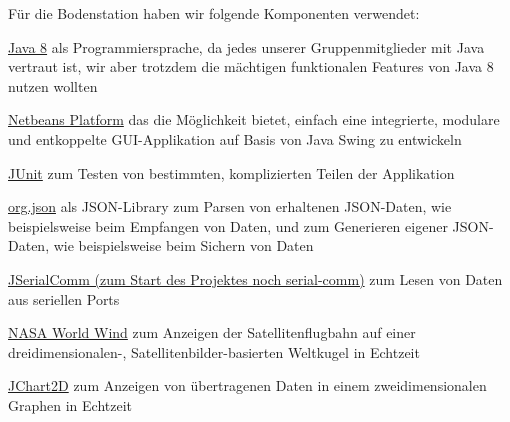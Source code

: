 Für die Bodenstation haben wir folgende Komponenten verwendet:
\begin{description}
	\item \href {http://www.oracle.com/technetwork/java/javase/downloads/jdk8-downloads-2133151.html}{Java 8} als Programmiersprache, da jedes unserer Gruppenmitglieder mit Java vertraut ist, wir aber trotzdem die mächtigen funktionalen Features von Java 8 nutzen wollten
	\item \href {https://netbeans.org/features/platform/}{Netbeans Platform} das die Möglichkeit bietet, einfach eine integrierte, modulare und entkoppelte GUI-Applikation auf Basis von Java Swing zu entwickeln
	\item \href {http://junit.org/}{JUnit} zum Testen von bestimmten, komplizierten Teilen der Applikation
	\item \href {http://www.json.org/java/}{org.json} als JSON-Library zum Parsen von erhaltenen JSON-Daten, wie beispielsweise beim Empfangen von Daten, und zum Generieren eigener JSON-Daten, wie beispielsweise beim Sichern von Daten
	\item \href {http://fazecast.github.io/jSerialComm/}{JSerialComm (zum Start des Projektes noch serial-comm)} zum Lesen von Daten aus seriellen Ports
	\item \href {http://worldwind.arc.nasa.gov/java/}{NASA World Wind} zum Anzeigen der Satellitenflugbahn auf einer dreidimensionalen-, Satellitenbilder-basierten Weltkugel  in Echtzeit
	\item \href {http://jchart2d.sourceforge.net/}{JChart2D} zum Anzeigen von übertragenen Daten in einem zweidimensionalen Graphen in Echtzeit 
\end{description}